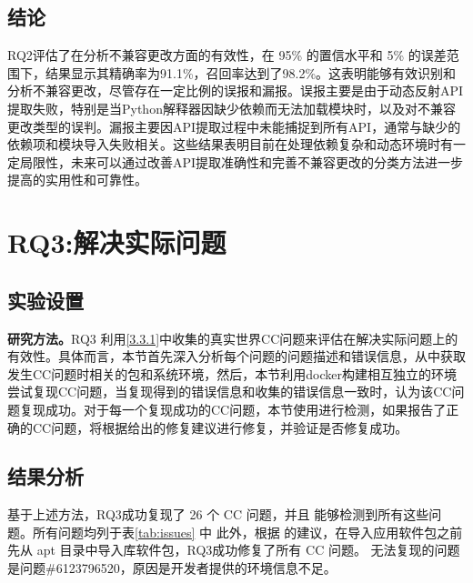 \subsection{结论}
RQ2评估了\tool{}在分析不兼容更改方面的有效性，在 95\% 的置信水平和 5\% 的误差范围下，结果显示其精确率为91.1\%，召回率达到了98.2\%。这表明\tool{}能够有效识别和分析不兼容更改，尽管存在一定比例的误报和漏报。误报主要是由于动态反射API提取失败，特别是当Python解释器因缺少依赖而无法加载模块时，以及对不兼容更改类型的误判。漏报主要因API提取过程中未能捕捉到所有API，通常与缺少的依赖项和模块导入失败相关。这些结果表明\tool{}目前在处理依赖复杂和动态环境时有一定局限性，未来可以通过改善API提取准确性和完善不兼容更改的分类方法进一步提高\tool{}的实用性和可靠性。

\section{RQ3:解决实际问题}
\subsection{实验设置}
\textbf{研究方法。}RQ3 利用\ref{3.3.1}中收集的真实世界CC问题来评估\tool{}在解决实际问题上的有效性。具体而言，本节首先深入分析每个问题的问题描述和错误信息，从中获取发生CC问题时相关的包和系统环境，然后，本节利用docker构建相互独立的环境尝试复现CC问题，当复现得到的错误信息和收集的错误信息一致时，认为该CC问题复现成功。对于每一个复现成功的CC问题，本节使用\tool{}进行检测，如果\tool{}报告了正确的CC问题，将根据\tool{}给出的修复建议进行修复，并验证是否修复成功。

\subsection{结果分析}
基于上述方法，RQ3成功复现了 26 个 CC 问题，并且 \tool{} 能够检测到所有这些问题。所有问题均列于表\ref{tab:issues} 中
此外，根据\tool{} 的建议，在导入应用软件包之前先从 apt 目录中导入库软件包，RQ3成功修复了所有 CC 问题。
无法复现的问题是问题\#6123796520，原因是开发者提供的环境信息不足。


